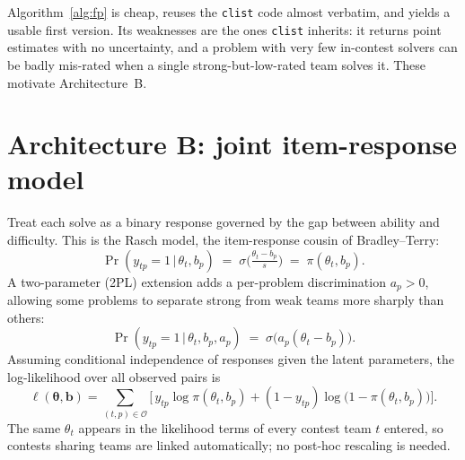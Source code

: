 \documentclass[11pt]{article}
\newcommand{\Obs}{\mathcal{O}}
\newcommand{\given}{\,\vert\,}
\theoremstyle{definition}
\begin{document}
\noindent
Algorithm~\ref{alg:fp} is cheap, reuses the \texttt{clist} code almost verbatim,
and yields a usable first version. Its weaknesses are the ones \texttt{clist}
inherits: it returns point estimates with no uncertainty, and a problem with very
few in-contest solvers can be badly mis-rated when a single strong-but-low-rated
team solves it. These motivate Architecture~B.

\section{Architecture B: joint item-response model}\label{sec:irt}

Treat each solve as a binary response governed by the gap between ability and
difficulty. This is the Rasch model, the item-response cousin of
Bradley--Terry:
\begin{equation}\label{eq:rasch}
  \Pr(y_{tp}=1 \given \theta_t, b_p)
  \;=\; \sigma\!\Big(\tfrac{\theta_t - b_p}{s}\Big)
  \;=\; \pi(\theta_t, b_p).
\end{equation}
A two-parameter (2PL) extension adds a per-problem discrimination $a_p>0$,
allowing some problems to separate strong from weak teams more sharply than
others:
\begin{equation}\label{eq:twopl}
  \Pr(y_{tp}=1 \given \theta_t, b_p, a_p)
  \;=\; \sigma\!\big(a_p(\theta_t - b_p)\big).
\end{equation}
Assuming conditional independence of responses given the latent parameters, the
log-likelihood over all observed pairs is
\begin{equation}\label{eq:loglik}
  \ell(\bm\theta,\bm b)
  = \sum_{(t,p)\in\Obs}
    \Big[\, y_{tp}\log \pi(\theta_t,b_p)
      + (1-y_{tp})\log\big(1-\pi(\theta_t,b_p)\big) \Big].
\end{equation}
The same $\theta_t$ appears in the likelihood terms of every contest team $t$
entered, so contests sharing teams are linked automatically; no post-hoc
rescaling is needed.
\end{document}
